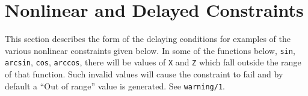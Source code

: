% 
% 
% 
% 
% 
% 
% 
% 
% 
% 
% 
% 
% 
% 
% 

\section{Nonlinear and Delayed Constraints}
\label{nl-section}

\noindent
\chgbarbegin
This section describes the form of the 
delaying conditions for examples of the various nonlinear
constraints given below.
In some of the functions below, {\tt sin}, {\tt arcsin},
{\tt cos}, {\tt arccos}, there will be values of {\tt X} and {\tt Z}
which fall outside the range of that function.
Such invalid values will cause the constraint to fail and by default
a ``Out of range'' value is generated. See {\tt warning/1}.
\chgbarend

